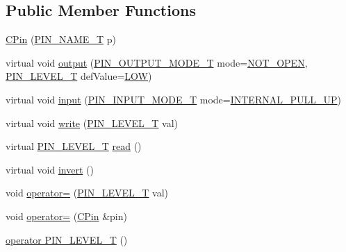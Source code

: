 \subsection*{Public Member Functions}
\begin{DoxyCompactItemize}
\item 
\hyperlink{class_c_pin_a7338f2960b4d8992c43f3c6067742ded}{C\-Pin} (\hyperlink{group___peripheral_ga65a2241721e4acb573e0c3fe29ac432f}{P\-I\-N\-\_\-\-N\-A\-M\-E\-\_\-\-T} p)
\item 
virtual void \hyperlink{class_c_pin_a84cd9c4613a9b53f00e52c23b4eed050}{output} (\hyperlink{group___peripheral_ga29412fef1d1b9fafc0cd270a5d702f28}{P\-I\-N\-\_\-\-O\-U\-T\-P\-U\-T\-\_\-\-M\-O\-D\-E\-\_\-\-T} mode=\hyperlink{group___peripheral_gga62483064e24f6949ab0a9b9234b4e549afd68b1a66f2a33ce77d4f6c7f8fc998a}{N\-O\-T\-\_\-\-O\-P\-E\-N}, \hyperlink{group___peripheral_gac4a9005971c102914017b5e21ae23a19}{P\-I\-N\-\_\-\-L\-E\-V\-E\-L\-\_\-\-T} def\-Value=\hyperlink{group___peripheral_gga445f12f54192283394084c5d36ab4dd1a6a226f4143ca3b18999551694cdb72a8}{L\-O\-W})
\item 
virtual void \hyperlink{class_c_pin_a21aa5b473c1a3637a487c7724f8b9fcf}{input} (\hyperlink{group___peripheral_gad5705547b72a4480dc714447b3bbfb64}{P\-I\-N\-\_\-\-I\-N\-P\-U\-T\-\_\-\-M\-O\-D\-E\-\_\-\-T} mode=\hyperlink{group___peripheral_gga16ce6180d8bb2eb23a7df8f8923ea581a781a7f23ae9b0dbdc6edfdcfd3be75df}{I\-N\-T\-E\-R\-N\-A\-L\-\_\-\-P\-U\-L\-L\-\_\-\-U\-P})
\item 
virtual void \hyperlink{class_c_pin_a1fc3486f4afea4de56ae677c20600551}{write} (\hyperlink{group___peripheral_gac4a9005971c102914017b5e21ae23a19}{P\-I\-N\-\_\-\-L\-E\-V\-E\-L\-\_\-\-T} val)
\item 
virtual \hyperlink{group___peripheral_gac4a9005971c102914017b5e21ae23a19}{P\-I\-N\-\_\-\-L\-E\-V\-E\-L\-\_\-\-T} \hyperlink{class_c_pin_a02060b0c9bbf0f75dead7bef1c75ce6b}{read} ()
\item 
virtual void \hyperlink{class_c_pin_a240de24c726724aeda90bfacf1d50cc5}{invert} ()
\item 
void \hyperlink{class_c_pin_a7d125bef83689d0f1db13b3f1acbd05e}{operator=} (\hyperlink{group___peripheral_gac4a9005971c102914017b5e21ae23a19}{P\-I\-N\-\_\-\-L\-E\-V\-E\-L\-\_\-\-T} val)
\item 
void \hyperlink{class_c_pin_a01428eca1b98e2e194bd0848b3eb8904}{operator=} (\hyperlink{class_c_pin}{C\-Pin} \&pin)
\item 
\hyperlink{class_c_pin_a9037649d1e88192f5fde46b810c71299}{operator P\-I\-N\-\_\-\-L\-E\-V\-E\-L\-\_\-\-T} ()

\end{DoxyCompactItemize}
